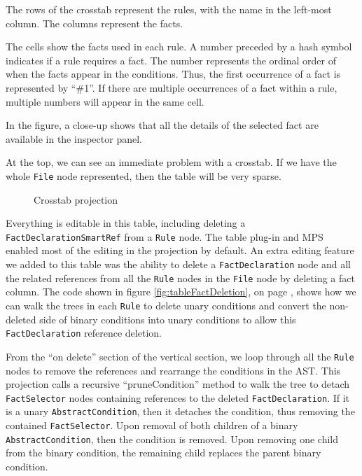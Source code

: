 The rows of the crosstab represent the rules, with the name in the left-most column.
The columns represent the facts.

The cells show the facts used in each rule.
A number preceded by a hash symbol indicates if a rule requires a fact.
The number represents the ordinal order of when the facts appear in the conditions.
Thus, the first occurrence of a fact is represented by ``\#1''.
If there are multiple occurrences of a fact within a rule, multiple numbers will appear in the same cell.

In the figure, a close-up shows that all the details of the selected fact are available in the inspector panel.

At the top, we can see an immediate problem with a crosstab.
If we have the whole \texttt{File} node represented, then the table will be very sparse.

\begin{figure}
    \centering
    \caption{Crosstab projection}
    \label{fig:crosstabProjection1}
\end{figure}

Everything is editable in this table, including deleting a \texttt{FactDeclarationSmartRef} from a \texttt{Rule} node.
The table plug-in and MPS enabled most of the editing in the projection by default.
An extra editing feature we added to this table was the ability to delete a \texttt{FactDeclaration} node and all the related references from all the \texttt{Rule} nodes in the \texttt{File} node by deleting a fact column.
The code shown in figure \ref{fig:tableFactDeletion}, on page \pageref{fig:tableFactDeletion}, shows how we can walk the trees in each \texttt{Rule} to delete unary conditions and convert the non-deleted side of binary conditions into unary conditions to allow this \texttt{FactDeclaration} reference deletion.

From the ``on delete'' section of the vertical section, we loop through all the \texttt{Rule} nodes to remove the references and rearrange the conditions in the AST.
This projection calls a recursive ``pruneCondition'' method to walk the tree to detach \texttt{FactSelector} nodes containing references to the deleted \texttt{FactDeclaration}.
If it is a unary \texttt{AbstractCondition}, then it detaches the condition, thus removing the contained \texttt{FactSelector}.
Upon removal of both children of a binary \texttt{AbstractCondition}, then the condition is removed.
Upon removing one child from the binary condition, the remaining child replaces the parent binary condition.

